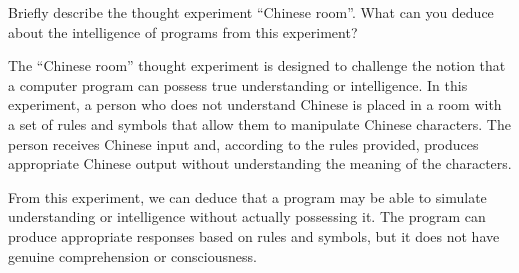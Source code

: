 \begin{ejercicio}
    Briefly describe the thought experiment ``Chinese room''. What can you deduce about the intelligence of programs from this experiment?

    The ``Chinese room'' thought experiment is designed to challenge the notion that a computer program can possess true understanding or intelligence. In this experiment, a person who does not understand Chinese is placed in a room with a set of rules and symbols that allow them to manipulate Chinese characters. The person receives Chinese input and, according to the rules provided, produces appropriate Chinese output without understanding the meaning of the characters.

    From this experiment, we can deduce that a program may be able to simulate understanding or intelligence without actually possessing it. The program can produce appropriate responses based on rules and symbols, but it does not have genuine comprehension or consciousness.
\end{ejercicio}